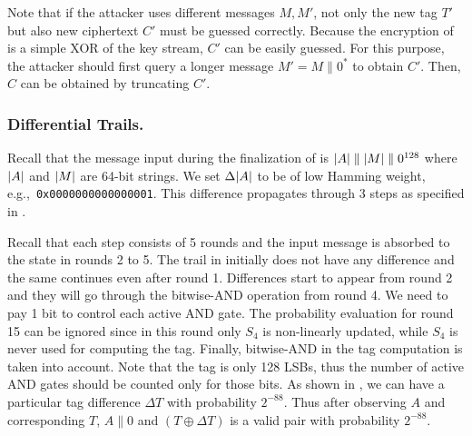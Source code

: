 Note that if the attacker uses different messages $M,M'$, not only the new tag $T'$ but also new ciphertext $C'$ must be guessed correctly. Because the encryption of \MORUS is a simple XOR of the key stream, $C'$ can be easily guessed. For this purpose, the attacker should first query a longer message $M'=M\|0^*$ to obtain $C'$. Then, $C$ can be obtained by truncating $C'$.

\subsubsection{Differential Trails.}
Recall that the message input during the finalization of \MORUS[1280] is $|A|\mathrel\||M|\mathrel\|0^{128}$ where $|A|$ and $|M|$ are 64-bit strings. We set $\Delta |A|$ to be of low Hamming weight, e.g.,~{\tt 0x0000000000000001}. 
This difference propagates through 3 steps as specified in .

Recall that each step consists of 5 rounds and the input message is absorbed to the state in rounds 2 to 5. The trail in  initially does not have any difference and the same continues even after round 1. Differences start to appear from round 2 and they will go through the bitwise-AND operation from round 4. We need to pay 1 bit to control each active AND gate. The probability evaluation for round 15 can be ignored since in this round only $S_4$ is non-linearly updated, while $S_4$ is never used for computing the tag. Finally, bitwise-AND in the tag computation is taken into account. Note that the tag is only 128 LSBs, thus the number of active AND gates should be counted only for those bits. As shown in , we can have a particular tag difference $\Delta T$ with probability $2^{-88}$. Thus after observing $A$ and corresponding $T$, $A\|0$ and $(T \oplus \Delta T)$ is a valid pair with probability $2^{-88}$.

